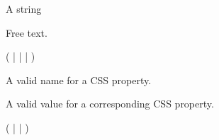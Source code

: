 \bigskip
\noindent
{}

A string

\bigskip
\noindent
{}

Free text.

\bigskip
\noindent
{}

(  |  |  | )

\bigskip
\noindent
{}

A valid name for a CSS property.

\bigskip
\noindent
{}

A valid value for a corresponding CSS property.

\bigskip
\noindent
{}

 (  |  |  )

